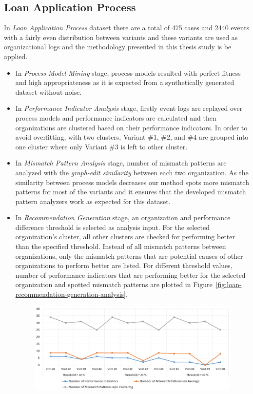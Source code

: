 \subsection{Loan Application Process}
\label{subsec:loan-app-process}

In \textit{Loan Application Process} dataset there are a total of 475 cases and 2440 events with a fairly even distribution between variants and these variants are used as organizational logs and the methodology presented in this thesis study is be applied.

\begin{itemize}
  \item In \textit{Process Model Mining} stage, process models resulted with perfect fitness and high appropriateness as it is expected from a synthetically generated dataset without noise.
  \item In \textit{Performance Indicator Analysis} stage, firstly event logs are replayed over process models and performance indicators are calculated and then organizations are clustered based on their performance indicators. In order to avoid overfitting,  with two clusters, Variant \#1, \#2, and \#4 are grouped into one cluster where only Variant \#3 is left to other cluster. 
  \item In \textit{Mismatch Pattern Analysis} stage, number of mismatch patterns are analyzed with the \textit{graph-edit similarity} between each two organization. As the similarity between process models decreases our method spots more mismatch patterns for most of the variants and it ensures that the developed mismatch pattern analyzers work as expected for this dataset. 
  \item In \textit{Recommendation Generation} stage, an organization and performance difference threshold is selected as analysis input. For the selected organization's cluster, all other clusters are checked for performing better than the specified threshold. Instead of all mismatch patterns between organizations, only the mismatch patterns that are potential causes of other organizations to perform better are listed. For different threshold values, number of performance indicators that are performing better for the selected organization and spotted mismatch patterns are plotted in Figure~\ref{fig:loan-recommendation-generation-analysis}. 
    \begin{figure}
    	\centering
    	\includegraphics[width=\textwidth]{5_results_discussions/loan-application-process/recommendation-generation-analysis}

\end{figure}
\end{itemize}
